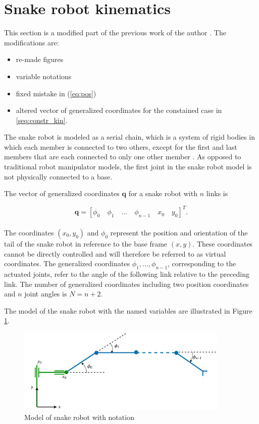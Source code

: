 \section{Snake robot kinematics}\label{sec:kin}

This section is a modified part of the previous work of the author \cite{AtussaProsjektoppgp}. The modifications are:
\begin{itemize}
    \item re-made figures
    \item variable notations
    \item fixed mistake in (\ref{eq:pos})
    \item altered vector of generalized coordinates for the constained case in \ref{seq:constr_kin}.
\end{itemize}

The snake robot is modeled as a serial chain, which is a system of rigid bodies in which each member is connected to two others, except for the first and last members that are each connected to only one other member \cite{waldron2016kinematics}. As opposed to traditional robot manipulator models, the first joint in the snake robot model is not physically connected to a base.


The vector of generalized coordinates $\mathbf{q}$ for a snake robot with $n$ links is

\begin{equation} \label{eq:q}
    \mathbf{q} = 
    [
        \phi_0 \quad \phi_1 \quad ... \quad \phi_{n-1} \quad x_0 \quad y_0
    ]^T.
\end{equation}
\\
The coordinates $(x_0, y_0)$ and $\phi_0$ represent the position and orientation of the tail of the snake robot in reference to the base frame $(x,y)$. These coordinates cannot be directly controlled and will therefore be referred to as virtual coordinates. The generalized coordinates ${\phi_1, ... ,  \phi_{n-1}}$, corresponding to the actuated joints, refer to the angle of the following link relative to the preceding link. The number of generalized coordinates including two position coordinates and $n$ joint angles is $N = n+2$.

The model of the snake robot with the named variables are illustrated in Figure \ref{fig:kin_name}. 
\begin{figure}
    \centering
    \includegraphics[width=0.9\textwidth]{figures/theory/kinematics1.pdf}
    \caption{Model of snake robot with notation}
    \label{fig:kin_name}
\end{figure}



